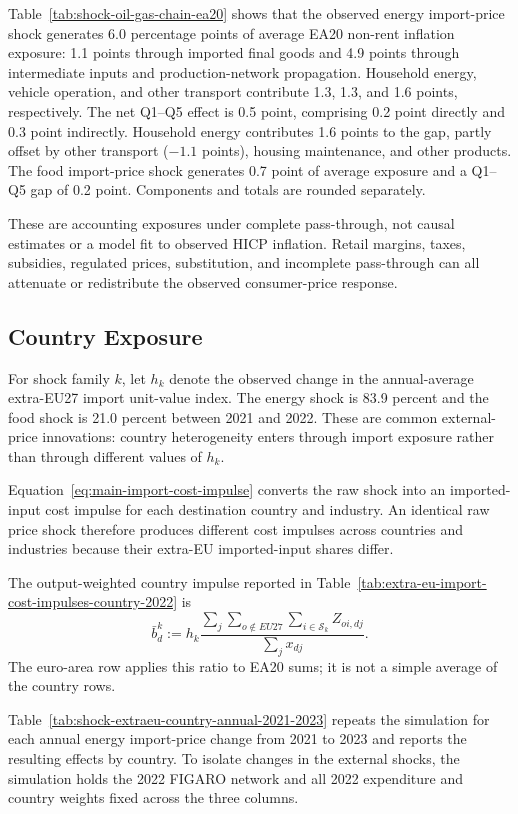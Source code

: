 Table~\ref{tab:shock-oil-gas-chain-ea20} shows that the observed energy import-price shock generates
6.0 percentage points of average EA20 non-rent inflation exposure: 1.1 points through imported
final goods and 4.9 points through intermediate inputs and production-network propagation.
Household energy, vehicle operation, and other transport contribute 1.3, 1.3, and 1.6 points,
respectively. The net Q1--Q5 effect is 0.5 point, comprising 0.2 point directly and 0.3 point
indirectly. Household energy contributes 1.6 points to the gap, partly offset by other transport
($-1.1$ points), housing maintenance, and other products.
The food import-price shock generates 0.7 point of average exposure and a Q1--Q5 gap of
0.2 point. Components and totals are rounded separately.

These are accounting exposures under complete pass-through, not causal estimates or a model fit to
observed HICP inflation. Retail margins, taxes, subsidies, regulated prices, substitution, and
incomplete pass-through can all attenuate or redistribute the observed consumer-price response.

\FloatBarrier

\subsection{Country Exposure}
\label{sec:app-import-cost-impulses}

For shock family $k$, let $h_k$ denote the observed change in the annual-average extra-EU27 import
unit-value index. The energy shock is 83.9 percent and the food shock is 21.0 percent between 2021
and 2022. These are common external-price innovations: country heterogeneity enters through import
exposure rather than through different values of $h_k$.

Equation~\eqref{eq:main-import-cost-impulse} converts the raw shock into an imported-input cost
impulse for each destination country and industry. An identical raw price shock therefore produces
different cost impulses across countries and industries because their extra-EU imported-input shares
differ.

The output-weighted country impulse reported in
Table~\ref{tab:extra-eu-import-cost-impulses-country-2022} is
\begin{equation}
\bar b_d^k
:=h_k\frac{\sum_j\sum_{o\notin EU27}\sum_{i\in\mathcal S_k}Z_{oi,dj}}
{\sum_j x_{dj}}.
\end{equation}
The euro-area row applies this ratio to EA20 sums; it is not a simple average of the country rows.



Table~\ref{tab:shock-extraeu-country-annual-2021-2023} repeats the simulation for each annual
energy import-price change from 2021 to 2023 and reports the resulting effects by country.
To isolate changes in the external shocks, the simulation holds the 2022 FIGARO network and all
2022 expenditure and country weights fixed across the three columns.



\clearpage
